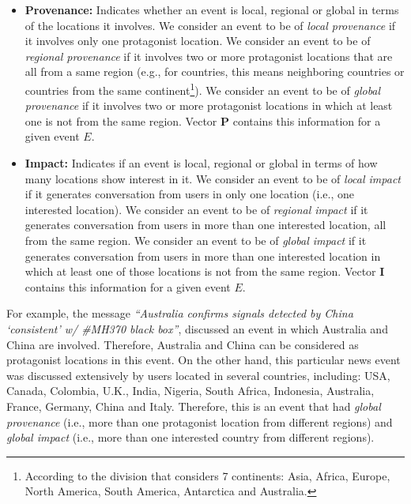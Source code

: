 \begin{itemize}
\item{\bf Provenance:} 
%
Indicates whether an event is local, regional or global in terms of the
locations it involves.
%
We consider an event to be of {\em local provenance} if it involves only one
protagonist location. 
%
We consider an event to be of {\em regional provenance} if it involves two or
more protagonist locations that are all from a same region (e.g., for countries,
this means neighboring countries or countries from the same continent\footnote{According to
the division that considers 7 continents: Asia, Africa, Europe, North America,
South America, Antarctica and Australia.}). 
%
We consider an event to be of {\em global provenance} if it involves two or more
protagonist locations in which at least one is not from the same region. 
%
Vector $\mathbf{P}$ contains this information for a given event $E$.


\item{\bf Impact:} 
%
Indicates if an event is local, regional or global in terms of how many
locations show interest in it. 
%
We consider an event to be of {\em local impact} if it generates conversation
from users in only one location (i.e., one interested location). 
%
We consider an event to be of {\em regional impact} if it generates conversation
from users in more than one interested location, all from the same region.  
%
We consider an event to be of {\em global impact} if it generates conversation
from users in more than one interested location in which at least one of those
locations is not from the same region. 
%
Vector $\mathbf{I}$ contains this information for a given event $E$.
\end{itemize}

For example, the message {\em ``Australia confirms signals detected by China
`consistent' w/ \#MH370 black box''}, discussed an event in which Australia and
China are involved. 
%
Therefore, Australia and China can be considered as protagonist locations in
this event. 
%
On the other hand, this particular news event was discussed extensively by users
located in several countries, including: USA, Canada, Colombia, U.K., India,
Nigeria, South Africa, Indonesia, Australia, France, Germany, China and Italy.
%
Therefore, this is an event that had {\em global provenance} (i.e., more than
one protagonist location from different regions) and {\em global impact} (i.e.,
more than one interested country from different regions).


